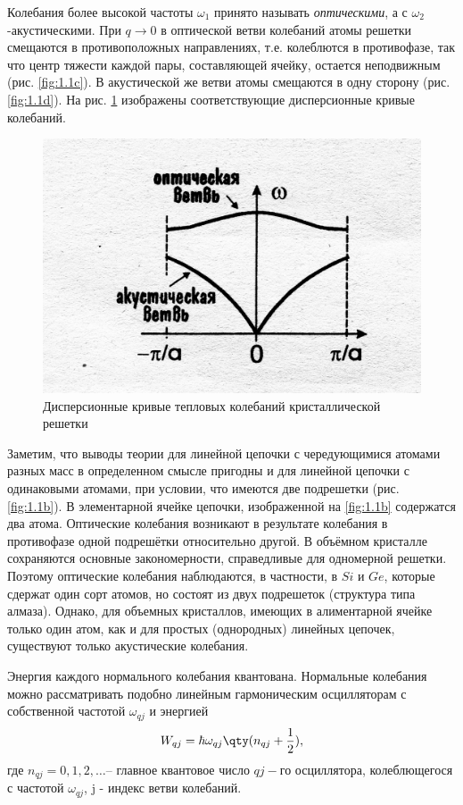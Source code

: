 Колебания более высокой частоты $\omega_1$  принято называть \textit{оптическими}, а 
с $\omega_2$-акустическими. При $q\rightarrow 0$ в оптической ветви колебаний атомы 
решетки смещаются в противоположных направлениях, т.е. колеблются в противофазе, так что
центр тяжести каждой пары, составляющей ячейку, остается неподвижным
(рис. \ref{fig:1.1c}). В акустической же ветви атомы смещаются в одну сторону
(рис. \ref{fig:1.1d}). На рис. \ref{fig:2} изображены соответствующие дисперсионные кривые колебаний.
\begin{figure}[h!]
	\centering
	\includegraphics[width=0.5\linewidth]{fig/12}
	\caption{Дисперсионные кривые тепловых колебаний кристаллической решетки}
	\label{fig:2}
\end{figure}

Заметим, что выводы теории для линейной цепочки с чередующимися атомами разных масс в определенном смысле пригодны и для линейной цепочки с одинаковыми атомами, при условии, что имеются две подрешетки (рис. \ref{fig:1.1b}). В элементарной ячейке цепочки, изображенной на \ref{fig:1.1b} содержатся два атома. Оптические колебания возникают 
в результате колебания в противофазе одной подрешётки  относительно другой. В объёмном кристалле сохраняются основные закономерности, справедливые для одномерной решетки. Поэтому оптические колебания наблюдаются, в частности, в $Si$ и $Ge$, которые сдержат один
сорт атомов, но состоят из двух подрешеток (структура типа алмаза). Однако,
для объемных кристаллов, имеющих в алиментарной ячейке только один атом,
как и для простых (однородных) линейных цепочек, существуют только акустические колебания.

Энергия каждого нормального колебания квантована. Нормальные колебания  можно рассматривать подобно линейным гармоническим осцилляторам с собственной частотой $\omega_{qj}$ и энергией
\begin{equation}
	W_{qj}=\hbar \omega_{qj}\qty(n_{qj}+\frac12),
\end{equation}
где $n_{qj}=0,1,2,\dots$-- главное квантовое число $qj-$го осциллятора, колеблющегося с частотой
$\omega_{qj}$, j - индекс ветви колебаний. 

